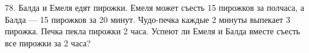 78. Балда и Емеля едят пирожки. Емеля может съесть 15 пирожков за полчаса, а Балда --- 15 пирожков за 20 минут. Чудо-печка каждые 2 минуты выпекает 3 пирожка. Печка пекла пирожки 2 часа. Успеют ли Емеля и Балда вместе съесть все пирожки за 2 часа?\\
